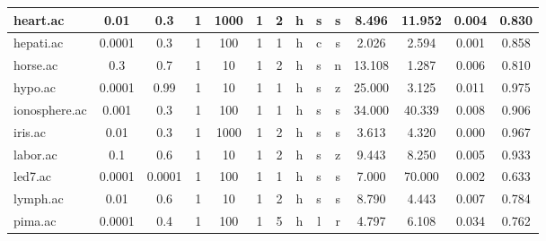 \begin{table}[htbp]
\begin{tabular}{|l|c|c|c|c|c|c|c|c|c||c|c|c|c|}
		\hline
		heart.ac       & 0.01     & 0.3         & 1              & 1000                & 1             & 2             & h      & s        & s        & 8.496          & 11.952         & 0.004          & 0.830          \\
		\hline
		hepati.ac      & 0.0001   & 0.3         & 1              & 100                 & 1             & 1             & h      & c        & s        & 2.026          & 2.594          & 0.001          & 0.858          \\
		\hline
		horse.ac       & 0.3      & 0.7         & 1              & 10                  & 1             & 2             & h      & s        & n        & 13.108         & 1.287          & 0.006          & 0.810          \\
		\hline
		hypo.ac        & 0.0001   & 0.99        & 1              & 10                  & 1             & 1             & h      & s        & z        & 25.000         & 3.125          & 0.011          & 0.975          \\
		\hline
		ionosphere.ac  & 0.001    & 0.3         & 1              & 100                 & 1             & 1             & h      & s        & s        & 34.000         & 40.339         & 0.008          & 0.906          \\
		\hline
		iris.ac        & 0.01     & 0.3         & 1              & 1000                & 1             & 2             & h      & s        & s        & 3.613          & 4.320          & 0.000          & 0.967          \\
		\hline
		labor.ac       & 0.1      & 0.6         & 1              & 10                  & 1             & 2             & h      & s        & z        & 9.443          & 8.250          & 0.005          & 0.933          \\
		\hline
		led7.ac        & 0.0001   & 0.0001      & 1              & 100                 & 1             & 1             & h      & s        & s        & 7.000          & 70.000         & 0.002          & 0.633          \\
		\hline
		lymph.ac       & 0.01     & 0.6         & 1              & 10                  & 1             & 2             & h      & s        & s        & 8.790          & 4.443          & 0.007          & 0.784          \\
		\hline
		pima.ac        & 0.0001   & 0.4         & 1              & 100                 & 1             & 5             & h      & l        & r        & 4.797          & 6.108          & 0.034          & 0.762          \\

\end{tabular}
\end{table}
